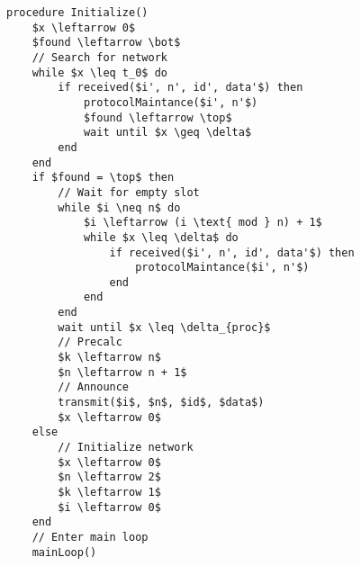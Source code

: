 \begin{minipage}{\linewidth} %
\begin{lstlisting}[label=lst:setupCCRC,style=pseudocode,mathescape=true,caption={Pseudocode example of the special case procedure Initialize()},basicstyle=\ttfamily]
procedure Initialize()
	$x \leftarrow 0$
	$found \leftarrow \bot$
	// Search for network
	while $x \leq t_0$ do
		if received($i', n', id', data'$) then
			protocolMaintance($i', n'$)
			$found \leftarrow \top$
			wait until $x \geq \delta$
		end
	end	
	if $found = \top$ then
		// Wait for empty slot
		while $i \neq n$ do
			$i \leftarrow (i \text{ mod } n) + 1$
			while $x \leq \delta$ do
				if received($i', n', id', data'$) then
					protocolMaintance($i', n'$)
				end
			end
		end
		wait until $x \leq \delta_{proc}$
		// Precalc
		$k \leftarrow n$
		$n \leftarrow n + 1$
		// Announce
		transmit($i$, $n$, $id$, $data$)
		$x \leftarrow 0$
	else
		// Initialize network
		$x \leftarrow 0$
		$n \leftarrow 2$
		$k \leftarrow 1$
		$i \leftarrow 0$
	end
	// Enter main loop
	mainLoop()
\end{lstlisting}   
\end{minipage}
